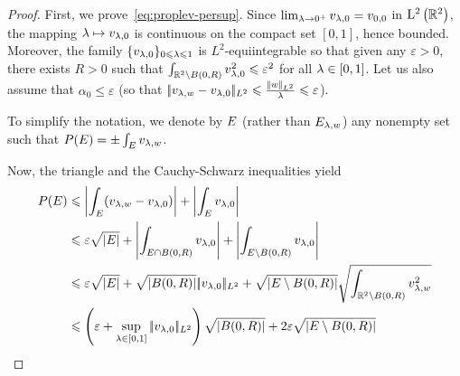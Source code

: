 \begin{proof}
  First, we prove~\eqref{eq:proplev-persup}. 
Since $\lim_{\lambda\to 0^+} v_{\lambda,0}=v_{0,0}$ in $\mathrm{L}^2\left(\mathbb{R}^2\right)$, the mapping $\lambda\mapsto v_{\lambda,0}$ is continuous on the compact set $[0,1]$, hence bounded. Moreover, the family $\{v_{\lambda,0}\}_{0\leqslant \lambda \leqslant 1}$ is $L^2$-equiintegrable so that given any $\varepsilon>0$, there exists $R>0$ such that $\int_{\mathbb{R}^2\setminus B(0,R)}v_{\lambda,0}^2\leqslant \varepsilon^2$ for all $\lambda \in [0,1]$.
Let us also assume that $\alpha_0\leq \varepsilon$ (so that $|\!| v_{\lambda,w}-v_{\lambda,0} |\!|_{L^2}\leqslant\frac{|\!| w |\!|_{L^2}}{\lambda}\leqslant \varepsilon$).

To simplify the notation, we denote by $E$ (rather than $E_{\lambda,w}$) any nonempty set such that $P(E)=\pm\int_{E}v_{\lambda,w}$.

Now, the triangle and the Cauchy-Schwarz inequalities yield
  \begin{align*}
    P(E)&\leqslant \left| \int_{E}(v_{\lambda,w}-v_{\lambda,0}) \right| + \left| \int_{E}v_{\lambda,0} \right|\\
            &\leqslant\varepsilon\sqrt{\left| E \right|}+ \left| \int_{E\cap B(0,R)}v_{\lambda,0} \right| + \left| \int_{E\setminus B(0,R)}v_{\lambda,0} \right|\\
            &\leqslant \varepsilon\sqrt{\left| E \right|}+ \sqrt{\left| B(0,R) \right|}|\!| v_{\lambda,0} |\!|_{L^2} + \sqrt{\left| E\setminus B(0,R) \right|}\sqrt{\int_{\mathbb{R}^2\setminus B(0,R)}v_{\lambda,w}^2}\\
            &\leqslant \left(\varepsilon +\sup_{\lambda\in[0,1]}|\!| v_{\lambda,0} |\!|_{L^2}\right) \sqrt{\left| B(0,R) \right|}+ 2\varepsilon\sqrt{\left| E\setminus B(0,R) \right|}\\
  \end{align*}

\end{proof}
